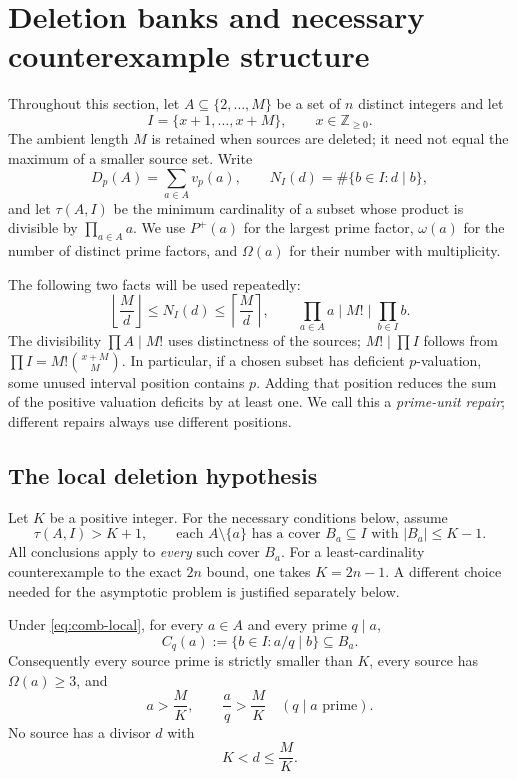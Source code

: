 \section{Deletion banks and necessary counterexample structure}
\label{sec:comb-banks}

Throughout this section, let $A\subseteq\{2,\ldots,M\}$ be a set of
$n$ distinct integers and let
\[
 I=\{x+1,\ldots,x+M\},\qquad x\in\mathbb Z_{\ge0}.
\]
The ambient length $M$ is retained when sources are deleted; it need
not equal the maximum of a smaller source set. Write
\[
 D_p(A)=\sum_{a\in A}v_p(a),\qquad
 N_I(d)=\#\{b\in I:d\mid b\},
\]
and let $\tau(A,I)$ be the minimum cardinality of a subset whose
product is divisible by $\prod_{a\in A}a$. We use $P^+(a)$ for the
largest prime factor, $\omega(a)$ for the number of distinct prime
factors, and $\Omega(a)$ for their number with multiplicity.

The following two facts will be used repeatedly:
\begin{equation}
 \left\lfloor\frac Md\right\rfloor\le N_I(d)
 \le\left\lceil\frac Md\right\rceil,
 \qquad
 \prod_{a\in A}a\mid M!\mid\prod_{b\in I}b.
 \label{eq:comb-supply}
\end{equation}
The divisibility $\prod A\mid M!$ uses distinctness of the sources;
$M!\mid\prod I$ follows from $\prod I=M!\binom{x+M}{M}$.
In particular, if a chosen subset has deficient $p$-valuation, some
unused interval position contains $p$. Adding that position reduces
the sum of the positive valuation deficits by at least one. We call
this a \emph{prime-unit repair}; different repairs always use
different positions.

\subsection{The local deletion hypothesis}

Let $K$ be a positive integer. For the necessary conditions below,
assume
\begin{equation}
 \tau(A,I)>K+1,
 \qquad
 \text{each }A\setminus\{a\}\text{ has a cover }B_a\subseteq I
 \text{ with }|B_a|\le K-1.
 \label{eq:comb-local}
\end{equation}
All conclusions apply to \emph{every} such cover $B_a$. For a
least-cardinality counterexample to the exact $2n$ bound, one takes
$K=2n-1$. A different choice needed for the asymptotic problem is
justified separately below.

\begin{lemma}
\label{lem:comb-forcing}
Under \eqref{eq:comb-local}, for every $a\in A$ and every prime $q\mid a$,
\[
 C_q(a):=\{b\in I:a/q\mid b\}\subseteq B_a.
\]
Consequently every source prime is strictly smaller than $K$,
every source has $\Omega(a)\ge3$, and
\begin{equation}
 a>\frac MK,
 \qquad \frac aq>\frac MK\quad(q\mid a\text{ prime}).
 \label{eq:comb-quotient-size}
\end{equation}
No source has a divisor $d$ with
\begin{equation}
 K<d\le\frac MK.
 \label{eq:comb-divisor-gap}
\end{equation}
\end{lemma}

